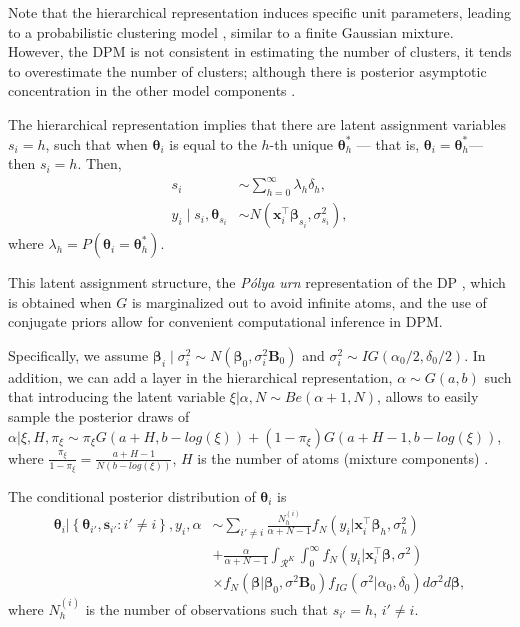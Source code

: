 Note that the hierarchical representation induces specific unit parameters, leading to a probabilistic clustering model \cite{Antoniak1974}, similar to a finite Gaussian mixture. However, the DPM is not consistent in estimating the number of clusters, it tends to overestimate the number of clusters; although there is posterior asymptotic concentration in the other model components \cite{Miller2014}.

The hierarchical representation implies that there are latent assignment variables \( s_i = h \), such that when \( \boldsymbol{\theta}_i \) is equal to the \( h \)-th unique \( \boldsymbol{\theta}_h^* \) — that is, \( \boldsymbol{\theta}_i = \boldsymbol{\theta}_h^* \)— then \( s_i = h \). Then,
\begin{align*}
	s_i&\sim \sum_{h=0}^{\infty}\lambda_h\delta_h,\\
	y_i\mid s_i, \boldsymbol{\theta}_{s_i}&\sim N(\boldsymbol{x}_i^{\top}\boldsymbol{\beta}_{s_i},\sigma^2_{s_i}),
\end{align*} 
where $\lambda_h=P(\boldsymbol{\theta}_{i}=\boldsymbol{\theta}_{h}^*)$.

This latent assignment structure, the \textit{Pólya urn} representation of the DP \cite{Blackwell1973}, which is obtained when \( G \) is marginalized out to avoid infinite atoms, and the use of conjugate priors allow for convenient computational inference in DPM.

Specifically, we assume $\boldsymbol{\beta}_i\mid \sigma^2_i\sim N(\boldsymbol{\beta}_0, \sigma^2_i\boldsymbol{B}_0)$ and $\sigma_i^2\sim IG(\alpha_0/2,\delta_0/2)$. In addition, we can add a layer in the hierarchical representation, $\alpha\sim G(a,b)$ such that introducing the latent variable $\xi|\alpha,N\sim Be(\alpha+1,N)$, allows to easily sample the posterior draws of  $\alpha|\xi,H,\pi_{\xi}\sim\pi_{\xi}{G}(a+H,b-log(\xi))+(1-\pi_{\xi}){G}(a+H-1,b-log(\xi))$, where $\frac{\pi_{\xi}}{1-\pi_{\xi}}=\frac{a+H-1}{N(b-log(\xi))}$, $H$ is the number of atoms (mixture components) \cite{Escobar1995}. 

The conditional posterior distribution of $\boldsymbol\theta_i$ is
\begin{align*}
	\boldsymbol\theta_i|\left\{\boldsymbol\theta_{i'},\boldsymbol s_{i'}:i'\neq i\right\}, y_i, \alpha & \sim \sum_{i'\neq i}\frac{N_h^{(i)}}{\alpha+N-1}f_N(y_i|\boldsymbol{x}_i^{\top}\boldsymbol{\beta}_h,\sigma_h^2)\\
	& +\frac{\alpha}{\alpha+N-1}\int_{\mathcal{R}^K}\int_{0}^{\infty}f_N(y_i|\boldsymbol{x}_i^{\top}\boldsymbol{\beta},\sigma^2)\\
	&\times f_N\left(\boldsymbol\beta\Big|\boldsymbol\beta_0,\sigma^2\boldsymbol B_0\right)f_{IG}(\sigma^2|\alpha_0,\delta_0)d\sigma^2 d\boldsymbol\beta,
\end{align*}
where $N_h^{(i)}$ is the number of observations such that $s_{i'}=h$, $i'\neq i$.

